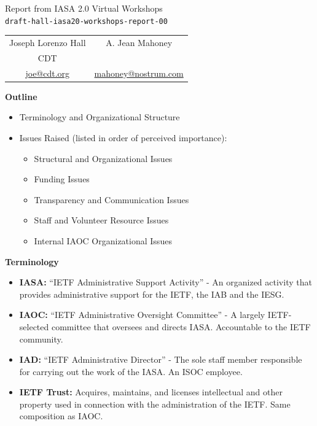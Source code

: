 \documentclass[helvetica]{seminar}
\newcommand{\heading}[1]{%
  \begin{center} 
    \large\bf 
    #1 
  \end{center} 
  \vspace{.4 in}}
\begin{document}
\begin{slide}
\begin{center}
\vspace{.5 in}
\LARGE{{\bf}Report from IASA 2.0 Virtual Workshops\\{\small \verb^draft-hall-iasa20-workshops-report-00^}}\\
\vspace{.2in}
\large{
\begin{tabular}{ c c }
Joseph Lorenzo Hall & A. Jean Mahoney\\
CDT & \\
\url{joe@cdt.org} & \url{mahoney@nostrum.com}
\end{tabular}
}
\end{center}
\end{slide}

\centerslidesfalse 

\begin{slide}
\heading{Outline}

\begin{itemize}
\item Terminology and Organizational Structure
\item Issues Raised (listed in order of perceived importance):
  \begin{itemize}
  \item Structural and Organizational Issues
  \item Funding Issues
  \item Transparency and Communication Issues
  \item Staff and Volunteer Resource Issues
  \item Internal IAOC Organizational Issues
  \end{itemize}
\end{itemize}

\end{slide}

\begin{slide}

\heading{Terminology}

{\footnotesize
\begin{itemize}
\item \textbf{IASA:} ``IETF Administrative Support Activity'' - An
  organized activity that provides administrative support for the
  IETF, the IAB and the IESG.
\item \textbf{IAOC:} ``IETF Administrative Oversight Committee'' - A
  largely IETF-selected committee that oversees and directs
  IASA. Accountable to the IETF community.
\item \textbf{IAD:} ``IETF Administrative Director'' - The sole staff
  member responsible for carrying out the work of the IASA. An ISOC
  employee.
\item \textbf{IETF Trust:} Acquires, maintains, and licenses
  intellectual and other property used in connection with the
  administration of the IETF. Same composition as IAOC.
\end{itemize}
}

\end{slide}
\end{document}
